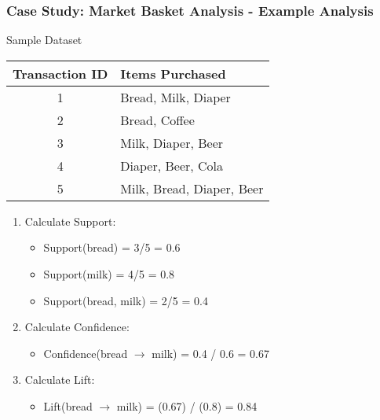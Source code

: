 \documentclass[aspectratio=169]{beamer}
\begin{document}
\begin{frame}[fragile]
    \frametitle{Case Study: Market Basket Analysis - Example Analysis}
    \begin{block}{Sample Dataset}
        \begin{tabular}{|c|l|}
            \hline
            Transaction ID & Items Purchased            \\
            \hline
            1              & Bread, Milk, Diaper        \\
            2              & Bread, Coffee              \\
            3              & Milk, Diaper, Beer         \\
            4              & Diaper, Beer, Cola         \\
            5              & Milk, Bread, Diaper, Beer  \\
            \hline
        \end{tabular}
    \end{block}
    
    \begin{enumerate}
        \item Calculate Support:
        \begin{itemize}
            \item Support(bread) = 3/5 = 0.6
            \item Support(milk) = 4/5 = 0.8
            \item Support(bread, milk) = 2/5 = 0.4
        \end{itemize}

        \item Calculate Confidence:
        \begin{itemize}
            \item Confidence(bread $\rightarrow$ milk) = 0.4 / 0.6 = 0.67
        \end{itemize}

        \item Calculate Lift:
        \begin{itemize}
            \item Lift(bread $\rightarrow$ milk) = (0.67) / (0.8) = 0.84
        \end{itemize}
    \end{enumerate}
\end{frame}
\end{document}
